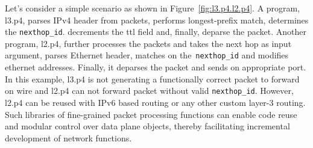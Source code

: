 \documentclass{hotnets19}
\begin{document}
Let's consider a simple scenario as shown in Figure~\ref{fig:l3.p4.l2.p4}. A program, l3.p4, parses IPv4 header from packets, performs longest-prefix match, determines the \texttt{nexthop\_id}. decrements the ttl field and, finally, deparse the packet. 
Another program, l2.p4, further processes the packets and takes the next hop as input argument, parses Ethernet header, matches on the~\texttt{nexthop\_id} and modifies ethernet addresses.
Finally, it deparses the packet and sends on appropriate port.
In this example, l3.p4 is not generating a functionally correct packet to forward on wire and l2.p4 can not forward packet without valid \texttt{nexthop\_id}. 
However, l2.p4 can be reused with IPv6 based routing or any other custom layer-3 routing.
Such libraries of fine-grained packet processing functions can enable code reuse and modular control over data plane objects, thereby facilitating incremental development of network functions. 
\end{document}

